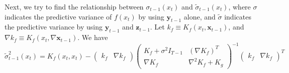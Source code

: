 \documentclass[a4paper,onecolumn]{article}
\begin{document}
\noindent Next, we try to find the relationship between $\sigma_{t-1}(x_t)$ and $\tilde{\sigma}_{t-1}(x_t)$,
where $\sigma$ indicates the predictive variance of $f(x_t)$ by using $\textbf{y}_{t-1}$ alone,
and $\tilde{\sigma}$ indicates the predictive variance by using $\textbf{y}_{t-1}$ and $\textbf{z}_{t-1}$.
Let $k_f\equiv K_f(x_t, \textbf{x}_{t-1})$, and $\nabla k_f \equiv K_f(x_t, \nabla \textbf{x}_{t-1})$. We have
$$
    \tilde{\sigma}^2_{t-1}(x_t) = K_f(x_t, x_t) - 
    \begin{pmatrix}
        k_f & \nabla k_f
    \end{pmatrix}
    \begin{pmatrix}
        K_f+\sigma^2 I_{T-1} & (\nabla K_f)^T\\
        \nabla K_f & \nabla^2 K_f + K_g
    \end{pmatrix}^{-1}
    \begin{pmatrix}
        k_f & \nabla k_f
    \end{pmatrix}^T
$$
\end{document}
